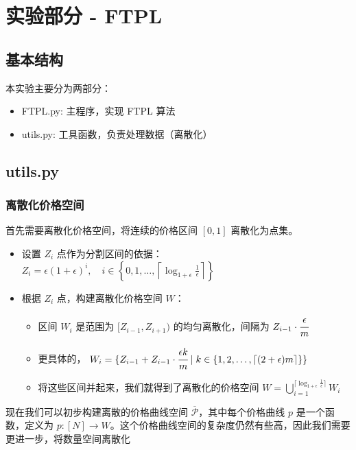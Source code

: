 \section{实验部分 - FTPL}

\subsection{基本结构}

本实验主要分为两部分：
\begin{itemize}
    \item FTPL.py: 主程序，实现 FTPL 算法
    \item utils.py: 工具函数，负责处理数据（离散化）
\end{itemize}

\subsection{utils.py}

\subsubsection{离散化价格空间}

首先需要离散化价格空间，将连续的价格区间 $[0, 1]$ 离散化为点集。

\begin{itemize}
    \item 设置 $Z_i$ 点作为分割区间的依据：$Z_i = \epsilon(1+\epsilon)^i,\quad i \in \left\{ 0, 1, \ldots, \left\lceil \log_{1+\epsilon} \frac{1}{\epsilon} \right\rceil \right\}$
    \item 根据 $Z_i$ 点，构建离散化价格空间 $W$：
    \begin{itemize}
        \item 区间 $W_i$ 是范围为 $[Z_{i-1},Z_{i+1})$ 的均匀离散化，间隔为 $Z_{i-1}\cdot \cfrac{\epsilon}{m}$
        \item 更具体的， $W_i = \{Z_{i-1} + Z_{i-1}\cdot \cfrac{\epsilon k}{m}\mid k\in \{1,2,\dots,\lceil(2+\epsilon)m\rceil\}\}$
        \item 将这些区间并起来，我们就得到了离散化的价格空间 $W = \bigcup_{i=1}^{\lceil \log_{1+\epsilon} \frac{1}{\epsilon} \rceil} W_i$
    \end{itemize}
\end{itemize}

现在我们可以初步构建离散的价格曲线空间 $\overline{\mathcal{P}}$，其中每个价格曲线 $p$ 是一个函数，定义为 $p: [N] \to W$。这个价格曲线空间的复杂度仍然有些高，因此我们需要更进一步，将数量空间离散化

